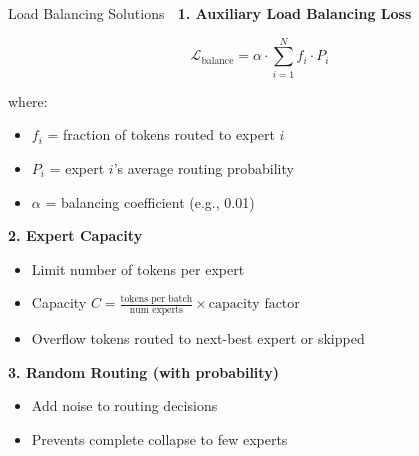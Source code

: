 \documentclass[aspectratio=169]{beamer}
\begin{document}
\begin{frame}[shrink=10]{Load Balancing Solutions 🔧}
\textbf{1. Auxiliary Load Balancing Loss}

$$\mathcal{L}_{\text{balance}} = \alpha \cdot \sum_{i=1}^{N} f_i \cdot P_i$$

where:
\begin{itemize}\setlength{\itemsep}{0pt}
    \item $f_i$ = fraction of tokens routed to expert $i$
    \item $P_i$ = expert $i$'s average routing probability
    \item $\alpha$ = balancing coefficient (e.g., 0.01)
\end{itemize}

\vspace{0.5em}

\textbf{2. Expert Capacity}
\begin{itemize}\setlength{\itemsep}{0pt}
    \item Limit number of tokens per expert
    \item Capacity $C = \frac{\text{tokens per batch}}{\text{num experts}} \times \text{capacity factor}$
    \item Overflow tokens routed to next-best expert or skipped
\end{itemize}

\vspace{0.5em}

\textbf{3. Random Routing (with probability)}
\begin{itemize}\setlength{\itemsep}{0pt}
    \item Add noise to routing decisions
    \item Prevents complete collapse to few experts
\end{itemize}
\end{frame}
\end{document}
